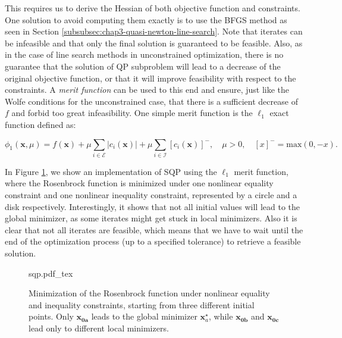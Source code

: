 This requires us to derive the Hessian of both objective function and
constraints. One solution to avoid computing them exactly is to use
the BFGS method as seen in Section
\ref{subsubsec:chap3-quasi-newton-line-search}. Note that iterates can
be infeasible and that only the final solution is guaranteed to be
feasible. Also, as in the case of line search methods in unconstrained
optimization, there is no guarantee that the solution of QP subproblem
will lead to a decrease of the original objective function, or that it
will improve feasibility with respect to the constraints. A
\emph{merit function} can be used to this end and ensure, just like
the Wolfe conditions for the unconstrained case, that there is a
sufficient decrease of $f$ \emph{} and forbid too great
infeasibility. One simple merit function is the $\ell_1$ exact
function defined as:

\begin{equation}
  \phi_1(\mathbf{x},\mu)= f(\mathbf{x}) +
  \mu\sum_{i\in\mathcal{E}}|c_i(\mathbf{x})| +
  \mu\sum_{i\in\mathcal{I}}[c_i(\mathbf{x})]^-, \quad\mu>0,
  \quad[x]^-=\text{max}(0,-x).
\end{equation}

In Figure \ref{fig:chap3-sqp}, we show an implementation of SQP using
the $\ell_1$ merit function, where the Rosenbrock function is
minimized under one nonlinear equality constraint and one nonlinear
inequality constraint, represented by a circle and a disk
respectively. Interestingly, it shows that not all initial values will
lead to the global minimizer, as some iterates might get stuck in
local minimizers. Also it is clear that not all iterates are feasible,
which means that we have to wait until the end of the optimization
process (up to a specified tolerance) to retrieve a feasible solution.

\begin{figure}
  \centering
      {\def\svgwidth{0.8\linewidth}
        {\footnotesize
          
                     {sqp.pdf_tex}
        }
      }
      \caption{Minimization of the Rosenbrock function under nonlinear
        equality and inequality constraints, starting from three
        different initial points. Only $\mathbf{x_{0a}}$ leads to the
        global minimizer $\mathbf{x}_a^\star$, while $\mathbf{x_{0b}}$
        and $\mathbf{x_{0c}}$ lead only to different local
        minimizers.}
      \label{fig:chap3-sqp}
\end{figure}

